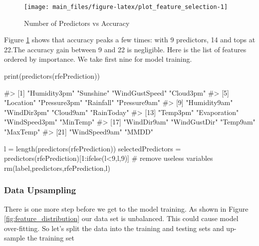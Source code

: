 \begin{Schunk}
\begin{figure}[H]

{\centering \texttt{[image: main\_files/figure-latex/plot\_feature\_selection-1]} 

}

\caption[Number of Predictors vs Accuracy]{Number of Predictors vs Accuracy}\label{fig:plot_feature_selection}
\end{figure}
\end{Schunk}

Figure \ref{fig:plot_feature_selection} shows that accuracy peaks a few
times: with 9 predictors, 14 and tops at 22.The accuracy gain between 9
and 22 is negligible. Here is the list of features ordered by
importance. We take first nine for model training.

\begin{Schunk}
\begin{Sinput}
print(predictors(rfePrediction))
\end{Sinput}
\begin{Soutput}
#>  [1] "Humidity3pm"   "Sunshine"      "WindGustSpeed" "Cloud3pm"     
#>  [5] "Location"      "Pressure3pm"   "Rainfall"      "Pressure9am"  
#>  [9] "Humidity9am"   "WindDir3pm"    "Cloud9am"      "RainToday"    
#> [13] "Temp3pm"       "Evaporation"   "WindSpeed3pm"  "MinTemp"      
#> [17] "WindDir9am"    "WindGustDir"   "Temp9am"       "MaxTemp"      
#> [21] "WindSpeed9am"  "MMDD"
\end{Soutput}
\end{Schunk}

\begin{Schunk}
\begin{Sinput}
l = length(predictors(rfePrediction))
selectedPredictors =  predictors(rfePrediction)[1:ifelse(l<9,l,9)]
# remove useless variables
rm(label,predictors,rfePrediction,l)
\end{Sinput}
\end{Schunk}

\hypertarget{data-upsampling}{%
\subsubsection{Data Upsampling}\label{data-upsampling}}

There is one more step before we get to the model training. As shown in
Figure \ref{fig:feature_distribution} our data set is unbalanced. This
could cause model over-fitting. So let's split the data into the
training and testing sets and up-sample the training set

